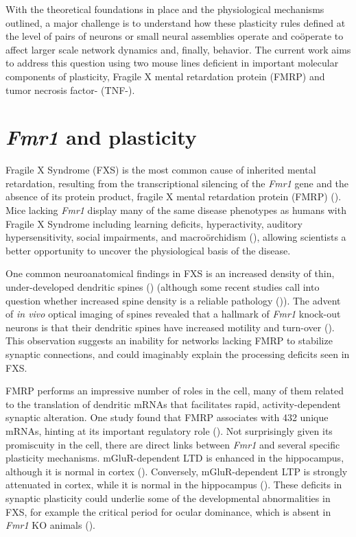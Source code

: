 With the theoretical foundations in place and the physiological mechanisms outlined, a major challenge is to understand how these plasticity rules defined at the level of pairs of neurons or small neural assemblies operate and co\"operate to affect larger scale network dynamics and, finally, behavior. The current work aims to address this question using two mouse lines deficient in important molecular components of plasticity, Fragile X mental retardation protein (FMRP) and tumor necrosis factor-\textalpha{} (TNF-\textalpha{}).

\section{\textit{Fmr1} and plasticity}

Fragile X Syndrome (FXS) is the most common cause of inherited mental retardation, resulting from the transcriptional silencing of the \textit{Fmr1} gene and the absence of its protein product, fragile X mental retardation protein (FMRP) (\cite{Bailey1998, Jin2003}). Mice lacking \textit{Fmr1} display many of the same disease phenotypes as humans with Fragile X Syndrome including learning deficits, hyperactivity, auditory hypersensitivity, social impairments, and macro\"orchidism (\cite{DutchBelgianFragileXConsortium1994, Bernardet2006, Moy2008}), allowing scientists a better opportunity to uncover the physiological basis of the disease.

One common neuroanatomical findings in FXS is an increased density of thin, under-developed dendritic spines (\cite{Hinton1991, Comery1997, Dolen2007, Liu2011}) (although some recent studies call into question whether increased spine density is a reliable pathology (\cite{Cruz-Martin2010, Harlow2010a, Meredith2007})). The advent of \textit{in vivo} optical imaging of spines revealed that a hallmark of \textit{Fmr1} knock-out neurons is that their dendritic spines have increased motility and turn-over (\cite{Cruz-Martin2010, Pan2010}). This observation suggests an inability for networks lacking FMRP to stabilize synaptic connections, and could imaginably explain the processing deficits seen in FXS.

FMRP performs an impressive number of roles in the cell, many of them related to the translation of dendritic mRNAs that facilitates rapid, activity-dependent synaptic alteration. One study found that FMRP associates with 432 unique mRNAs, hinting at its important regulatory role (\cite{Brown2001}). Not surprisingly given its promiscuity in the cell, there are direct links between \textit{Fmr1} and several specific plasticity mechanisms. mGluR-dependent LTD is enhanced in the hippocampus, although it is normal in cortex (\cite{Huber2002}). Conversely, mGluR-dependent LTP is strongly attenuated in cortex, while it is normal in the hippocampus (\cite{Li2002, Zhao2005, Wilson2007}). These deficits in synaptic plasticity could underlie some of the developmental abnormalities in FXS, for example the critical period for ocular dominance, which is absent in \textit{Fmr1} KO animals (\cite{Dolen2007}).

